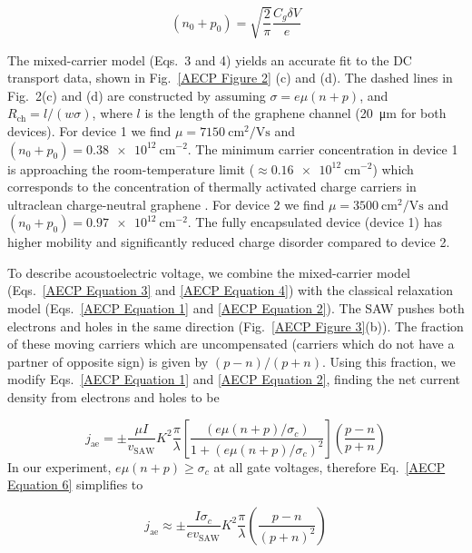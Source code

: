 \documentclass{beavtex_dub_edit}
\begin{document}
\begin{equation}
    (n_0 + p_0) = \sqrt{\frac{2}{\pi}}\frac{C_g \delta V}{e}
    \label{AECP Equation 5}
\end{equation}

The mixed-carrier model (Eqs.\ 3 and 4) yields an accurate fit to the DC transport data, shown in Fig.\ \ref{AECP Figure 2} (c) and (d). The dashed lines in Fig.\ 2(c) and (d) are constructed by assuming $\sigma = e\mu(n + p)$, and $R_{\mathrm{ch}} = l/(w\sigma)$, where $l$ is the length of the graphene channel (\SI{20}{\micro\meter} for both devices). For device 1 we find $\mu = \SI{7150}{\centi\meter^2/\volt\second}$ and $(n_0+p_0) =  \SI{0.38e12}{\centi\meter^{-2}}$. The minimum carrier concentration in device 1 is approaching the room-temperature limit ($\approx \SI{0.16e12}{\centi\meter^{-2}}$) which corresponds to the concentration of thermally activated charge carriers in ultraclean charge-neutral graphene \cite{xin_giant_2023}.  For device 2 we find $\mu = \SI{3500}{\centi\meter^2/\volt\second}$ and $(n_0+p_0) =\SI{0.97e12}{\centi\meter^{-2}}$. The fully encapsulated device (device 1) has higher mobility and significantly reduced charge disorder compared to device 2. 

To describe acoustoelectric voltage, we combine the mixed-carrier model (Eqs.\ \ref{AECP Equation 3} and \ref{AECP Equation 4}) with the classical relaxation model (Eqs.\ \ref{AECP Equation 1} and \ref{AECP Equation 2}). The SAW pushes both electrons and holes in the same direction (Fig.\ \ref{AECP Figure 3}(b)). The fraction of these moving carriers which are uncompensated (carriers which do not have a partner of opposite sign) is given by $(p-n)/(p+n)$.  Using this fraction, we modify Eqs.\ \ref{AECP Equation 1} and \ref{AECP Equation 2}, finding the net current density from electrons and holes to be

\begin{equation}
    j_{\mathrm{ae}} = \pm \frac{\mu I}{v_{\mathrm{SAW}}}K^2\frac{\pi}{\lambda}\left[\frac{(e\mu(n+p)/\sigma_c)}{1+ (e\mu(n+p)/\sigma_c)^2}\right]\left(\frac{p-n}{p+n}\right)
    \label{AECP Equation 6}
\end{equation}
In our experiment, $e\mu(n + p) \geq \sigma_c$ at all gate voltages, therefore Eq.\ \ref{AECP Equation 6} simplifies to 

\begin{equation}
    j_{\mathrm{ae}} \approx \pm \frac{I \sigma_c}{e v_{\mathrm{SAW}}}K^2\frac{\pi}{\lambda}\left(\frac{p-n}{(p+n)^2}\right)
    \label{AECP Equation 7}
\end{equation}
\end{document}
